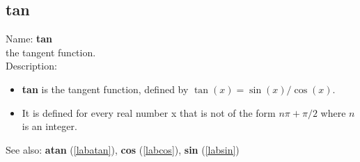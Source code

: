 \subsection{tan}
\label{labtan}
\noindent Name: \textbf{tan}\\
the tangent function.\\
\noindent Description: \begin{itemize}

\item \textbf{tan} is the tangent function, defined by $\tan(x) = \sin(x)/\cos(x)$.

\item It is defined for every real number x that is not of the form $n\pi + \pi/2$ where $n$ is an integer.
\end{itemize}
See also: \textbf{atan} (\ref{labatan}), \textbf{cos} (\ref{labcos}), \textbf{sin} (\ref{labsin})

